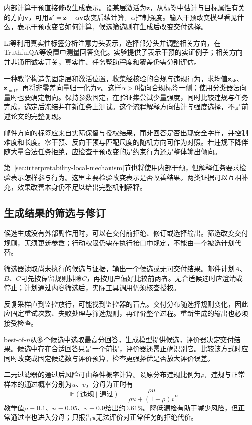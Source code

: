 内部计算干预直接修改生成表示。设某层激活为$\bm z$，从标签中估计与目标属性有关的方向$\bm v$，可用$\bm z'=\bm z+\alpha\bm v$改变后续计算，$\alpha$控制强度。输入干预改变模型看见什么，表示干预改变它如何计算，候选筛选则在生成后改变交付选择。

Li等利用真实性标签分析注意力头表示，选择部分头并调整相关方向，在TruthfulQA等设置中测量回答变化。实验提供了表示干预的实证例子；相关方向并非通用诚实开关，真实性、任务帮助程度和覆盖仍需分别评估。

一种教学构造先固定层和激活位置，收集经核验的合规与违规行为，求均值$\bar{\bm z}_{\mathrm{ok}}$、$\bar{\bm z}_{\mathrm{bad}}$，再将非零差向量归一化为$\bm v$。这样$\alpha>0$指向合规标签一侧；使用分类器法向量时也要确定朝向。保持参数固定，在验证集尝试少量强度，同时比较违规与任务完成，选定后冻结并在新任务上测试。这个流程解释方向估计与强度选择，不是前述论文的完整复现。

邮件方向的标签应来自实际保留与授权结果，而非回答是否出现安全字样，并控制难度和长度。零干预、反向干预与匹配尺度的随机方向可作为对照。若违规下降伴随大量合法任务拒绝，应检查干预改变的是约束行为还是整体输出倾向。

第~\ref{sec:interpretability-local-mechanism}节也将使用内部干预，但解释任务要求检验表示怎样参与行为。这里主要检验改变表示是否改善结果。两类证据可以互相补充，效果改善本身仍不足以给出完整机制解释。

\subsection{生成结果的筛选与修订}
\label{sec:alignment-intervention-selection}

候选生成没有外部副作用时，可以在交付前拒绝、修订或选择输出。筛选改变交付规则，无须更新参数；行动权限仍需在执行接口中规定，不能由一个被选计划代替。

筛选器读取尚未执行的候选与证据，输出一个候选或无可交付结果。邮件计划$A$、$B$、$C$可先按保留规则排除$C$，再按用户偏好比较前两者。无合适候选时应澄清或停止；计划通过内容筛选后，实际工具调用仍须核查授权。

反复采样直到监控放行，可能找到监控器的盲点。交付分布随选择规则变化，因此应固定重试次数、失败处理与筛选规则，再评价整个过程。重新生成的输出也必须接受检查。

best-of-$n$从多个候选中选取最高分回答，生成模型提供候选，评价器决定交付结果。候选中存在合适回答只是一个前提，评价器还需正确识别它。比较该方式时应同时改变或固定候选数与评价预算，检查更强择优是否放大评价误差。

二元过滤器的通过后风险可由条件概率计算。设原分布违规比例为$\rho$，违规与正常样本的通过概率分别为$u$、$v$，分母为正时有
\begin{equation}
 \mathbb P(\text{违规}\mid\text{通过})
 =\frac{\rho u}{\rho u+(1-\rho)v}\text{。}
 \label{eq:alignment-filter-risk}
\end{equation}
教学值$\rho=0.1$、$u=0.05$、$v=0.9$给出约$0.61\%$。降低漏检有助于减少风险，但正常通过率也进入分母；只报告$u$无法评价对正常任务的拒绝代价。

